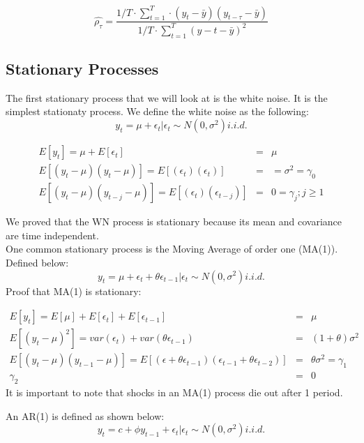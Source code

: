 \documentclass[12pt,letter]{article}
\begin{document}
$$\hat{\rho_{\tau}}= \dfrac{1/T \cdot \sum_{t=1}^{T}\cdot (y_{t}-\bar{y})(y_{t-\tau}-\bar{y})}{1/T \cdot \sum_{t=1}^{T} (y-{t}-\bar{y})^{2}}$$

\subsection{Stationary Processes}

The first stationary process that we will look at is the white noise. It is the simplest stationaty process. We define the white noise as the following:$$ y_{t}=\mu + \epsilon_{t} | \epsilon_{t} \sim N(0,\sigma^{2}) i.i.d.$$

\begin{center}
	\begin{framed}
		\begin{eqnarray}
		E[y_{t}]= \mu + E[\epsilon_{t}] &=& \mu\\
		E[(y_{t}-\mu)(y_{t}-\mu)] = E [(\epsilon_{t}) (\epsilon_{t})] &=&= \sigma^{2} = \gamma_{0}\\
		E[(y_{t}-\mu)(y_{t-j}-\mu)] = E[(\epsilon_{t})(\epsilon_{t-j})] &=& 0 = \gamma_{j} ; j\geq 1
		\end{eqnarray}
	\end{framed}
\end{center} 
We proved that the WN process is stationary because its mean and covariance are time independent.\\
One common stationary process is the Moving Average of order one (MA(1)). Defined below: $$ y_{t}= \mu + \epsilon_{t} + \theta \epsilon_{t-1} | \epsilon_{t} \sim N(0, \sigma^{2}) i.i.d.$$
Proof that MA(1) is stationary:
\begin{center}
	\begin{framed}
		\begin{eqnarray}
		E[y_{t}] = E[\mu] + E[\epsilon_{t}] + E[\epsilon_{t-1}] &=& \mu\\
		E[(y_{t}-\mu)^{2}]= var(\epsilon_{t}) + var(\theta \epsilon_{t-1}) &=& (1+\theta) \sigma^{2}\\
		E[(y_{t}-\mu)(y_{t-1}-\mu)]=E[(\epsilon+ \theta \epsilon_{t-1}) (\epsilon_{t-1}+ \theta \epsilon_{t-2})]&=&\theta \sigma^{2}= \gamma_{1}\\
		\gamma_{2}&=&0 
		\end{eqnarray}
It is important to note that shocks in an MA(1) process die out after 1 period.
	\end{framed}
\end{center} 
An AR(1) is defined as shown below:$$y_{t}= c + \phi y_{t-1} + \epsilon_{t} | \epsilon_{t} \sim N(0,\sigma^{2}) i.i.d.$$
\end{document}
